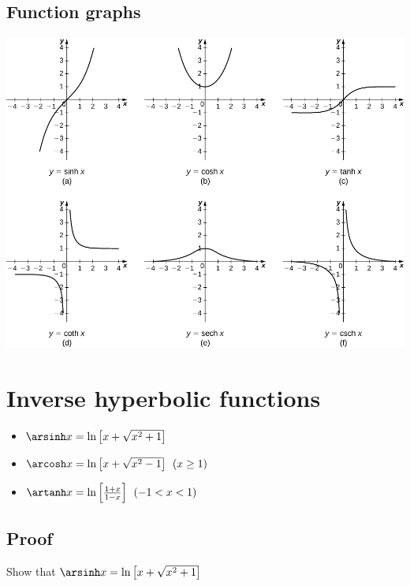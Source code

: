 \subsection{Function graphs}
\includegraphics[width=\linewidth]{images/hyperbolic_graphs}

\section{Inverse hyperbolic functions}
\begin{itemize}
    \item $\arsinh x = \ln \left[x+\sqrt{x^2+1}\right]$
    \item $\arcosh x = \ln \left[x+\sqrt{x^2-1}\right] \:\: (x \geq 1)$
    \item $\artanh x = \ln \left[\frac{1+x}{1-x}\right] \:\: (-1 < x < 1)$
\end{itemize}

\subsection{Proof}
\begin{example}
    Show that $\arsinh x = \ln \left[x+\sqrt{x^2+1}\right]$
\end{example}

